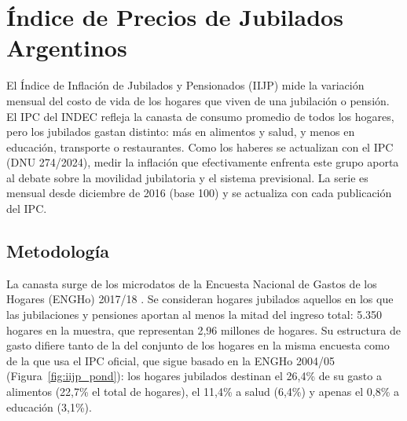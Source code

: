 %

\section{Índice de Precios de Jubilados Argentinos}

El Índice de Inflación de Jubilados y Pensionados (IIJP) mide la variación mensual del costo de vida de los hogares que viven de una jubilación o pensión. El IPC del INDEC \cite{indec_ipc} refleja la canasta de consumo promedio de todos los hogares, pero los jubilados gastan distinto: más en alimentos y salud, y menos en educación, transporte o restaurantes. Como los haberes se actualizan con el IPC (DNU 274/2024), medir la inflación que efectivamente enfrenta este grupo aporta al debate sobre la movilidad jubilatoria y el sistema previsional. La serie es mensual desde diciembre de 2016 (base 100) y se actualiza con cada publicación del IPC.

\subsection{Metodología}

La canasta surge de los microdatos de la Encuesta Nacional de Gastos de los Hogares (ENGHo) 2017/18 \cite{indec_engho}. Se consideran hogares jubilados aquellos en los que las jubilaciones y pensiones aportan al menos la mitad del ingreso total: 5.350 hogares en la muestra, que representan 2,96 millones de hogares. Su estructura de gasto difiere tanto de la del conjunto de los hogares en la misma encuesta como de la que usa el IPC oficial, que sigue basado en la ENGHo 2004/05 (Figura~\ref{fig:iijp_pond}): los hogares jubilados destinan el 26,4\% de su gasto a alimentos (22,7\% el total de hogares), el 11,4\% a salud (6,4\%) y apenas el 0,8\% a educación (3,1\%).

